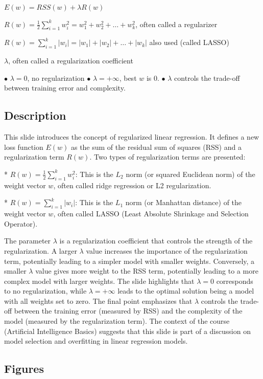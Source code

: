 \documentclass{article}%
\begin{document}
$E(w) = RSS(w) + \lambda R(w)$

$R(w) = \frac{1}{2} \sum_{i=1}^{k} w_i^2 = w_1^2 + w_2^2 + \dots + w_k^2$, often called a regularizer

$R(w) = \sum_{i=1}^{k} |w_i| = |w_1| + |w_2| + \dots + |w_k|$ also used (called LASSO)

$\lambda$, often called a regularization coefficient

$\bullet$ $\lambda = 0$, no regularization
$\bullet$ $\lambda = +\infty$, best $w$ is 0.
$\bullet$ $\lambda$ controls the trade-off between training error and complexity.
%
\subsection{Description}%
This slide introduces the concept of regularized linear regression.  It defines a new loss function $E(w)$ as the sum of the residual sum of squares (RSS) and a regularization term $R(w)$.  Two types of regularization terms are presented:

* $R(w) = \frac{1}{2} \sum_{i=1}^{k} w_i^2$:  This is the $L_2$ norm (or squared Euclidean norm) of the weight vector $w$, often called ridge regression or L2 regularization.

* $R(w) = \sum_{i=1}^{k} |w_i|$: This is the $L_1$ norm (or Manhattan distance) of the weight vector $w$, often called LASSO (Least Absolute Shrinkage and Selection Operator).

The parameter $\lambda$ is a regularization coefficient that controls the strength of the regularization.  A larger $\lambda$ value increases the importance of the regularization term, potentially leading to a simpler model with smaller weights.  Conversely, a smaller $\lambda$ value gives more weight to the RSS term, potentially leading to a more complex model with larger weights.  The slide highlights that $\lambda = 0$ corresponds to no regularization, while $\lambda = +\infty$ leads to the optimal solution being a model with all weights set to zero.  The final point emphasizes that $\lambda$ controls the trade-off between the training error (measured by RSS) and the complexity of the model (measured by the regularization term).  The context of the course (Artificial Intelligence Basics) suggests that this slide is part of a discussion on model selection and overfitting in linear regression models.%
\subsection{Figures}%
\begin{figure}[H]%
\centering%
\end{figure}
\end{document}
